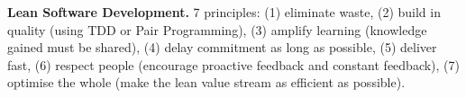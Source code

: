 \textbf{Lean Software Development.}
7 principles: (1) eliminate waste, (2) build in quality (using TDD or Pair Programming), (3) amplify learning (knowledge gained must be shared), (4) delay commitment as long as possible, (5) deliver fast, (6) respect people (encourage proactive feedback and constant feedback), (7) optimise the whole (make the lean value stream as efficient as possible).